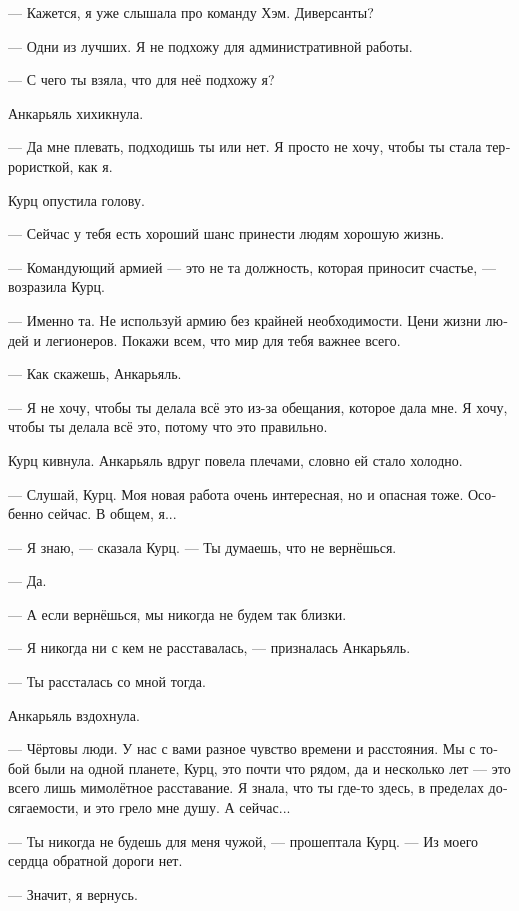 \documentclass[a4paper,10pt,fleqn]{book}\usepackage{polyglossia}\setdefaultlanguage[babelshorthands=true]{russian}\setotherlanguage{english}\defaultfontfeatures{Ligatures=TeX,Mapping=tex-text}\usepackage{xcolor}\newcommand{\ml}[3]{#2}
\begin{document}
--- Кажется, я уже слышала про команду Хэм.
Диверсанты?

--- Одни из лучших.
Я не подхожу для административной работы.

--- С чего ты взяла, что для неё подхожу я?

Анкарьяль хихикнула.

--- Да мне плевать, подходишь ты или нет.
Я просто не хочу, чтобы ты стала террористкой, как я.

Курц опустила голову.

--- Сейчас у тебя есть хороший шанс принести людям хорошую жизнь.

--- Командующий армией --- это не та должность, которая приносит счастье, --- возразила Курц.

--- Именно та.
Не используй армию без крайней необходимости.
Цени жизни людей и легионеров.
Покажи всем, что мир для тебя важнее всего.

--- Как скажешь, Анкарьяль.

--- Я не хочу, чтобы ты делала всё это из-за обещания, которое дала мне.
Я хочу, чтобы ты делала всё это, потому что это правильно.

Курц кивнула.
Анкарьяль вдруг повела плечами, словно ей стало холодно.

--- Слушай, Курц.
Моя новая работа очень интересная, но и опасная тоже.
Особенно сейчас.
В общем, я...

--- Я знаю, --- сказала Курц.
--- Ты думаешь, что не вернёшься.

--- Да.

\ml{$0$}
{--- А если вернёшься, мы никогда не будем так близки.}
{``And even if you come back, we'll never be as close as we are now.''}

--- Я никогда ни с кем не расставалась, --- призналась Анкарьяль.

--- Ты рассталась со мной тогда.

Анкарьяль вздохнула.

--- Чёртовы люди.
У нас с вами разное чувство времени и расстояния.
Мы с тобой были на одной планете, Курц, это почти что рядом, да и несколько лет --- это всего лишь мимолётное расставание.
Я знала, что ты где-то здесь, в пределах досягаемости, и это грело мне душу.
А сейчас...

--- Ты никогда не будешь для меня чужой, --- прошептала Курц.
\ml{$0$}
{--- Из моего сердца обратной дороги нет.}
{``There's no way back from my heart.''}

--- Значит, я вернусь.
\end{document}
